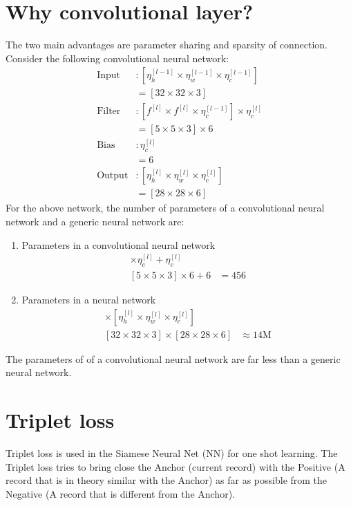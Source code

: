 \documentclass{book}
\begin{document}
\section{Why convolutional layer?}
The two main advantages are parameter sharing and sparsity of connection.
Consider the following convolutional neural network: 
\begin{align*}
\mathrm{Input} & :  [\eta_h^{[l-1]} \times \eta_w^{[l-1]} \times \eta_c^{[l-1]}] \\
& = [32 \times 32 \times 3] \\
\mathrm{Filter} & : [f^{[l]} \times f^{[l]} \times \eta_c^{[l-1]}] \times \eta_c^{[l]} \\
& = [5 \times 5 \times 3] \times 6 \\
\mathrm{Bias} & : \eta_c^{[l]} \\
& = 6 \\
\mathrm{Output} & : [\eta_h^{[l]} \times \eta_w^{[l]} \times \eta_c^{[l]}] \\
& = [28 \times 28 \times 6]
\end{align*}
For the above network, the number of parameters of a convolutional neural network and a generic neural network are:
\begin{enumerate}\addtolength{\itemsep}{-0.5\baselineskip}
\item Parameters in a convolutional neural network
\begin{align*}
[f^{[l]} \times f^{[l]} \times \eta_c^{[l-1]}] \times \eta_c^{[l]} +  \eta_c^{[l]} &\\
[5 \times 5 \times 3] \times 6 + 6 & = 456
\end{align*}
\item Parameters in a neural network
\begin{align*}
[\eta_h^{[l-1]} \times \eta_w^{[l-1]} \times \eta_c^{[l-1]}]  \times [\eta_h^{[l]} \times \eta_w^{[l]} \times \eta_c^{[l]}]  & \\
[32 \times 32 \times 3] \times [28 \times 28 \times 6] & \approx 14\mathrm{M}
\end{align*}
\end{enumerate}
The parameters of of a convolutional neural network are far less than a generic neural network.

\section{Triplet loss}
Triplet loss is used in the Siamese Neural Net (NN) for one shot learning.
The Triplet loss tries to bring close the Anchor (current record) with the Positive (A record that is in theory similar with the Anchor) as far as possible from the Negative (A record that is different from the Anchor).
\end{document}
